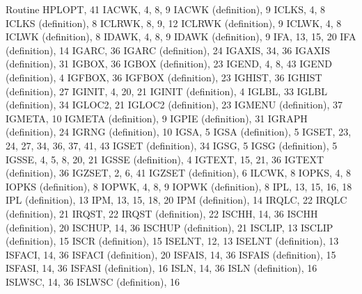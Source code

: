 \begin{theindex}
  \item Routine
    \subitem HPLOPT, 41
    \subitem IACWK, 4, 8, 9
    \subitem IACWK (definition), 9
    \subitem ICLKS, 4, 8
    \subitem ICLKS (definition), 8
    \subitem ICLRWK, 8, 9, 12
    \subitem ICLRWK (definition), 9
    \subitem ICLWK, 4, 8
    \subitem ICLWK (definition), 8
    \subitem IDAWK, 4, 8, 9
    \subitem IDAWK (definition), 9
    \subitem IFA, 13, 15, 20
    \subitem IFA (definition), 14
    \subitem IGARC, 36
    \subitem IGARC (definition), 24
    \subitem IGAXIS, 34, 36
    \subitem IGAXIS (definition), 31
    \subitem IGBOX, 36
    \subitem IGBOX (definition), 23
    \subitem IGEND, 4, 8, 43
    \subitem IGEND (definition), 4
    \subitem IGFBOX, 36
    \subitem IGFBOX (definition), 23
    \subitem IGHIST, 36
    \subitem IGHIST (definition), 27
    \subitem IGINIT, 4, 20, 21
    \subitem IGINIT (definition), 4
    \subitem IGLBL, 33
    \subitem IGLBL (definition), 34
    \subitem IGLOC2, 21
    \subitem IGLOC2 (definition), 23
    \subitem IGMENU (definition), 37
    \subitem IGMETA, 10
    \subitem IGMETA (definition), 9
    \subitem IGPIE (definition), 31
    \subitem IGRAPH (definition), 24
    \subitem IGRNG (definition), 10
    \subitem IGSA, 5
    \subitem IGSA (definition), 5
    \subitem IGSET, 23, 24, 27, 34, 36, 37, 41, 43
    \subitem IGSET (definition), 34
    \subitem IGSG, 5
    \subitem IGSG (definition), 5
    \subitem IGSSE, 4, 5, 8, 20, 21
    \subitem IGSSE (definition), 4
    \subitem IGTEXT, 15, 21, 36
    \subitem IGTEXT (definition), 36
    \subitem IGZSET, 2, 6, 41
    \subitem IGZSET (definition), 6
    \subitem ILCWK, 8
    \subitem IOPKS, 4, 8
    \subitem IOPKS (definition), 8
    \subitem IOPWK, 4, 8, 9
    \subitem IOPWK (definition), 8
    \subitem IPL, 13, 15, 16, 18
    \subitem IPL (definition), 13
    \subitem IPM, 13, 15, 18, 20
    \subitem IPM (definition), 14
    \subitem IRQLC, 22
    \subitem IRQLC (definition), 21
    \subitem IRQST, 22
    \subitem IRQST (definition), 22
    \subitem ISCHH, 14, 36
    \subitem ISCHH (definition), 20
    \subitem ISCHUP, 14, 36
    \subitem ISCHUP (definition), 21
    \subitem ISCLIP, 13
    \subitem ISCLIP (definition), 15
    \subitem ISCR (definition), 15
    \subitem ISELNT, 12, 13
    \subitem ISELNT (definition), 13
    \subitem ISFACI, 14, 36
    \subitem ISFACI (definition), 20
    \subitem ISFAIS, 14, 36
    \subitem ISFAIS (definition), 15
    \subitem ISFASI, 14, 36
    \subitem ISFASI (definition), 16
    \subitem ISLN, 14, 36
    \subitem ISLN (definition), 16
    \subitem ISLWSC, 14, 36
    \subitem ISLWSC (definition), 16

\end{theindex}
